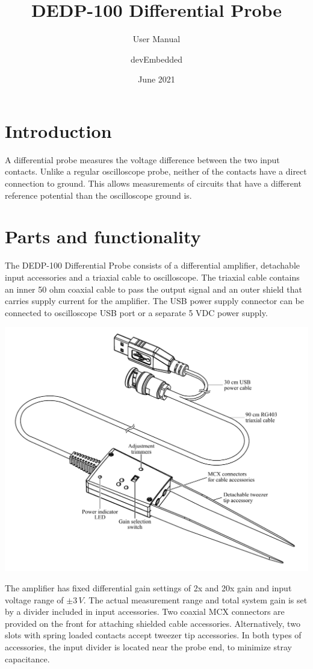 \documentclass[10pt]{manual}
\title{DEDP-100 Differential Probe}
\subtitle{User Manual}
\author{devEmbedded}
\date{June 2021}
\begin{document}
\maketitle
\newpage

\section{Introduction}

A differential probe measures the voltage difference between the two input contacts.
Unlike a regular oscilloscope probe, neither of the contacts have a direct connection to ground.
This allows measurements of circuits that have a different reference potential than the oscilloscope ground is.

\section{Parts and functionality}

The DEDP-100 Differential Probe consists of a differential amplifier,
detachable input accessories and a triaxial cable to oscilloscope.
The triaxial cable contains an inner 50 ohm coaxial cable to pass the output signal and an outer shield that carries supply current for the amplifier.
The USB power supply connector can be connected to oscilloscope USB port or a separate 5 VDC power supply.

\includegraphics[width=17cm]{perspective_view.pdf}

The amplifier has fixed differential gain settings of 2x and 20x gain and input voltage range of $\pm3\,V$.
The actual measurement range and total system gain is set by a divider included in input accessories.
Two coaxial MCX connectors are provided on the front for attaching shielded cable accessories.
Alternatively, two slots with spring loaded contacts accept tweezer tip accessories.
In both types of accessories, the input divider is located near the probe end, to minimize stray capacitance.
\end{document}
